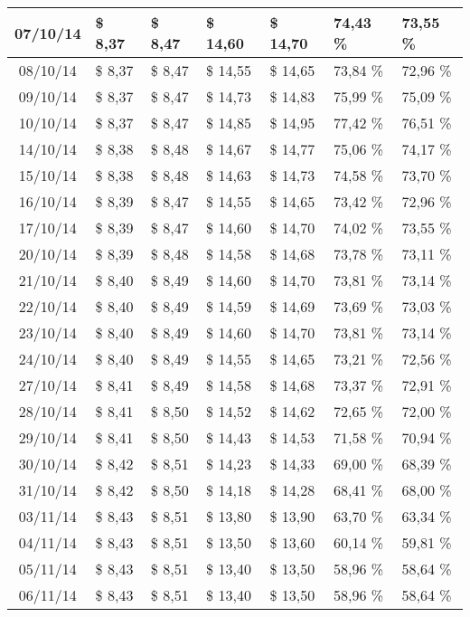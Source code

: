 \begin{center}
\begin{longtable}{|c|p{1.5cm}|p{1.5cm}|p{1.5cm}|p{1.5cm}|p{1.5cm}|p{1.5cm}|}
07/10/14 & \$ 8,37 & \$ 8,47 & \$ 14,60 & \$ 14,70 & 74,43 \% & 73,55 \% \\ \hline
08/10/14 & \$ 8,37 & \$ 8,47 & \$ 14,55 & \$ 14,65 & 73,84 \% & 72,96 \% \\ \hline
09/10/14 & \$ 8,37 & \$ 8,47 & \$ 14,73 & \$ 14,83 & 75,99 \% & 75,09 \% \\ \hline
10/10/14 & \$ 8,37 & \$ 8,47 & \$ 14,85 & \$ 14,95 & 77,42 \% & 76,51 \% \\ \hline
14/10/14 & \$ 8,38 & \$ 8,48 & \$ 14,67 & \$ 14,77 & 75,06 \% & 74,17 \% \\ \hline
15/10/14 & \$ 8,38 & \$ 8,48 & \$ 14,63 & \$ 14,73 & 74,58 \% & 73,70 \% \\ \hline
16/10/14 & \$ 8,39 & \$ 8,47 & \$ 14,55 & \$ 14,65 & 73,42 \% & 72,96 \% \\ \hline
17/10/14 & \$ 8,39 & \$ 8,47 & \$ 14,60 & \$ 14,70 & 74,02 \% & 73,55 \% \\ \hline
20/10/14 & \$ 8,39 & \$ 8,48 & \$ 14,58 & \$ 14,68 & 73,78 \% & 73,11 \% \\ \hline
21/10/14 & \$ 8,40 & \$ 8,49 & \$ 14,60 & \$ 14,70 & 73,81 \% & 73,14 \% \\ \hline
22/10/14 & \$ 8,40 & \$ 8,49 & \$ 14,59 & \$ 14,69 & 73,69 \% & 73,03 \% \\ \hline
23/10/14 & \$ 8,40 & \$ 8,49 & \$ 14,60 & \$ 14,70 & 73,81 \% & 73,14 \% \\ \hline
24/10/14 & \$ 8,40 & \$ 8,49 & \$ 14,55 & \$ 14,65 & 73,21 \% & 72,56 \% \\ \hline
27/10/14 & \$ 8,41 & \$ 8,49 & \$ 14,58 & \$ 14,68 & 73,37 \% & 72,91 \% \\ \hline
28/10/14 & \$ 8,41 & \$ 8,50 & \$ 14,52 & \$ 14,62 & 72,65 \% & 72,00 \% \\ \hline
29/10/14 & \$ 8,41 & \$ 8,50 & \$ 14,43 & \$ 14,53 & 71,58 \% & 70,94 \% \\ \hline
30/10/14 & \$ 8,42 & \$ 8,51 & \$ 14,23 & \$ 14,33 & 69,00 \% & 68,39 \% \\ \hline
31/10/14 & \$ 8,42 & \$ 8,50 & \$ 14,18 & \$ 14,28 & 68,41 \% & 68,00 \% \\ \hline
03/11/14 & \$ 8,43 & \$ 8,51 & \$ 13,80 & \$ 13,90 & 63,70 \% & 63,34 \% \\ \hline
04/11/14 & \$ 8,43 & \$ 8,51 & \$ 13,50 & \$ 13,60 & 60,14 \% & 59,81 \% \\ \hline
05/11/14 & \$ 8,43 & \$ 8,51 & \$ 13,40 & \$ 13,50 & 58,96 \% & 58,64 \% \\ \hline
06/11/14 & \$ 8,43 & \$ 8,51 & \$ 13,40 & \$ 13,50 & 58,96 \% & 58,64 \% \\ \hline

\end{longtable}
\end{center}
